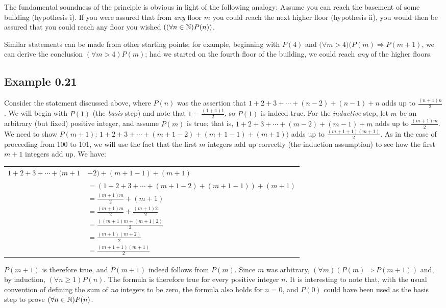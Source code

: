 The fundamental soundness of the principle is obvious in light of the following
analogy: Assume you can reach the basement of some building (hypothesis i). If
you were assured that from \emph{any} floor $m$ you could reach the next higher
floor (hypothesis ii), you would then be assured that you could reach any floor
you wished $((\forall n \in \mathbb{N})P(n))$.

Similar statements can be made from other starting points; for example,
beginning with $P(4)$ and $(\forall m$$>$$4)(P(m) \Rightarrow P(m + 1)$, we can
derive the conclusion $(\forall m > 4)P(m)$; had we started on the fourth floor
of the building, we could reach \emph{any} of the higher floors.

\subsection*{Example 0.21}

Consider the statement discussed above, where $P(n)$ was the assertion that
$1 + 2 + 3 + \cdots + (n - 2) + (n - 1) + n$ adds up to $\frac{(n + 1)n}{2}$. We
will begin with $P(1)$ (the \emph{basis} step) and note that
$1=\frac{(1 + 1)1}{2}$, so $P(1)$ is indeed true. For the \emph{inductive} step, let
$m$ be an arbitrary (but fixed) positive integer, and assume $P(m)$ is true;
that is, $1 + 2 + 3 + \cdots + (m - 2) + (m - 1) + m$ adds up to
$\frac{(m + 1)m}{2}$. We need to show
$P(m+1)$: $1+2+3+\cdots+(m+1-2)+(m+1-1)+(m+1))$ adds up to $\frac{(m+1+1)(m+1)}
{2}$. As in the case of proceeding from 100 to 101, we will use the fact that
the first $m$ integers add up correctly (the induction assumption) to see how
the first $m+1$ integers add up. We have:
\begin{center}\begin{tabular}{r@{ }l}
$1+2+3+\cdots+(m+1$ & $-2)+(m+1-1)+(m+1)$ \\
& $=(1+2+3+\cdots+(m+1-2)+(m+1-1))+(m+1)$ \\
& $=\frac{(m + 1)m}{2} + (m + 1)$ \\
& $=\frac{(m + 1)m}{2} + \frac{(m + 1)2}{2}$ \\
& $=\frac{((m + 1)m + (m + 1)2)}{2}$ \\
& $=\frac{(m + 1)(m + 2)}{2}$ \\
& $=\frac{(m + 1 + 1)(m + 1)}{2}$
\end{tabular}\end{center}

$P(m+1)$ is therefore true, and $P(m + 1)$ indeed follows from $P(m)$. Since $m$
was arbitrary, $(\forall m)(P(m) \Rightarrow P(m + 1))$ and, by induction,
$(\forall n \geq 1)P(n)$. The formula is therefore true for every positive
integer $n$. It is interesting to note that, with the usual convention of
defining the sum of \emph{no} integers to be zero, the formula also holds for $n = 0$,
and $P(0)$ could have been used as the basis step to prove
$(\forall n \in \mathbb{N})P(n)$.

